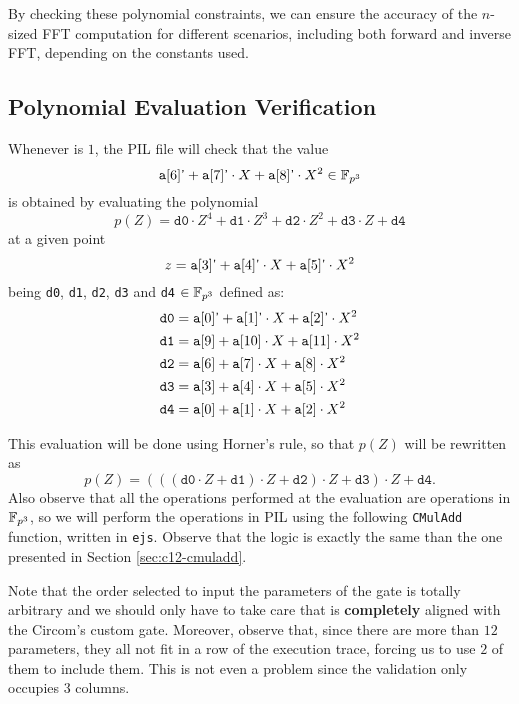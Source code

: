 By checking these polynomial constraints, we can ensure the accuracy of the $n$-sized FFT computation for different scenarios, including both forward and inverse FFT, depending on the constants used. 

\subsection{Polynomial Evaluation Verification}

Whenever \EVPOL is $1$, the PIL file will check that the value 
\[
\texttt{a}[6] \textsf{'} + \texttt{a}[7] \textsf{'} \cdot X + \texttt{a}[8] \textsf{'} \cdot X^2 \in \mathbb{F}_{p^3}
\]
is obtained by evaluating the polynomial
\[
p(Z) = \texttt{d0} \cdot Z^4 + \texttt{d1} \cdot Z^3 + \texttt{d2} \cdot Z^2 + \texttt{d3} \cdot Z + \texttt{d4}
\]
at a given point 
\[
z = \texttt{a}[3] \textsf{'} + \texttt{a}[4] \textsf{'} \cdot X + \texttt{a}[5] \textsf{'} \cdot X^2
\]
being \texttt{d0}, \texttt{d1}, \texttt{d2}, \texttt{d3} and \texttt{d4} $\in \mathbb{F}_{p^3}$ defined as:
\begin{align*}
&\texttt{d0} = \texttt{a}[0] \textsf{'} + \texttt{a}[1] \textsf{'} \cdot X + \texttt{a}[2] \textsf{'} \cdot X^2 \\
&\texttt{d1} = \texttt{a}[9] + \texttt{a}[10] \cdot X + \texttt{a}[11] \cdot X^2 \\
&\texttt{d2} = \texttt{a}[6] + \texttt{a}[7] \cdot X + \texttt{a}[8] \cdot X^2   \\
&\texttt{d3} = \texttt{a}[3] + \texttt{a}[4] \cdot X + \texttt{a}[5] \cdot X^2   \\
&\texttt{d4} = \texttt{a}[0] + \texttt{a}[1] \cdot X + \texttt{a}[2] \cdot X^2
\end{align*}

This evaluation will be done using Horner's rule, so that $p(Z)$ will be rewritten as
\[
p(Z) = (((\texttt{d0} \cdot Z + \texttt{d1}) \cdot Z + \texttt{d2}) \cdot Z + \texttt{d3}) \cdot Z + \texttt{d4}.
\]
Also observe that all the operations performed at the evaluation are operations in $\mathbb{F}_{p^3}$, so we will perform the operations in PIL using the following \texttt{CMulAdd} function, written in \texttt{ejs}. Observe that the logic is exactly the same than the one presented in Section \ref{sec:c12-cmuladd}.

Note that the order selected to input the parameters of the \EVPOL gate is totally arbitrary and we should only have to take care that is \textbf{completely} aligned with the Circom's custom gate. Moreover, observe that, since there are more than $12$ parameters, they all not fit in a row of the execution trace, forcing us to use $2$ of them to include them. This is not even a problem since the validation only occupies $3$ columns. 

